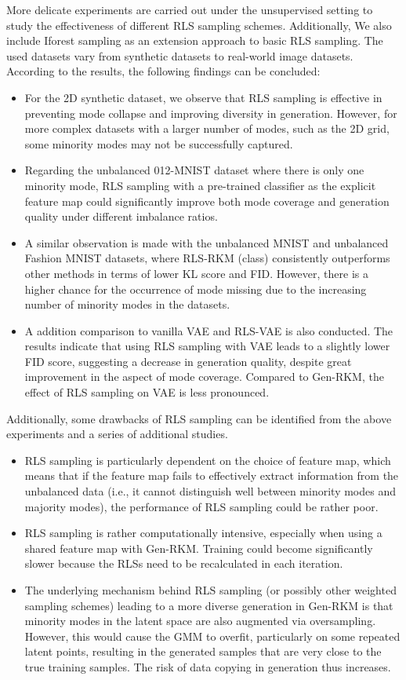 More delicate experiments are carried out under the unsupervised setting to study the effectiveness of different RLS sampling schemes. Additionally, We also include Iforest sampling as an extension approach to basic RLS sampling. The used datasets vary from synthetic datasets to real-world image datasets. According to the results, the following findings can be concluded:
\begin{itemize}[label={--}]
    \item For the 2D synthetic dataset, we observe that RLS sampling is effective in preventing mode collapse and improving diversity in generation. However, for more complex datasets with a larger number of modes, such as the 2D grid, some minority modes may not be successfully captured.
    \item Regarding the unbalanced 012-MNIST dataset where there is only one minority mode, RLS sampling with a pre-trained classifier as the explicit feature map could significantly improve both mode coverage and generation quality under different imbalance ratios.
    \item A similar observation is made with the unbalanced MNIST and unbalanced Fashion MNIST datasets, where RLS-RKM (class) consistently outperforms other methods in terms of lower KL score and FID. However, there is a higher chance for the occurrence of mode missing due to the increasing number of minority modes in the datasets.
    \item A addition comparison to vanilla VAE and RLS-VAE is also conducted. The results indicate that using RLS sampling with VAE leads to a slightly lower FID score, suggesting a decrease in generation quality, despite great improvement in the aspect of mode coverage. Compared to Gen-RKM, the effect of RLS sampling on VAE is less pronounced.
\end{itemize}
Additionally, some drawbacks of RLS sampling can be identified from the above experiments and a series of additional studies.
\begin{itemize}[label={--}]
    \item RLS sampling is particularly dependent on the choice of feature map, which means that if the feature map fails to effectively extract information from the unbalanced data (i.e., it cannot distinguish well between minority modes and majority modes), the performance of RLS sampling could be rather poor.
    \item RLS sampling is rather computationally intensive, especially when using a shared feature map with Gen-RKM. Training could become significantly slower because the RLSs need to be recalculated in each iteration.
    \item The underlying mechanism behind RLS sampling (or possibly other weighted sampling schemes) leading to a more diverse generation in Gen-RKM is that minority modes in the latent space are also augmented via oversampling. However, this would cause the GMM to overfit, particularly on some repeated latent points, resulting in the generated samples that are very close to the true training samples. The risk of data copying in generation thus increases.
\end{itemize}

